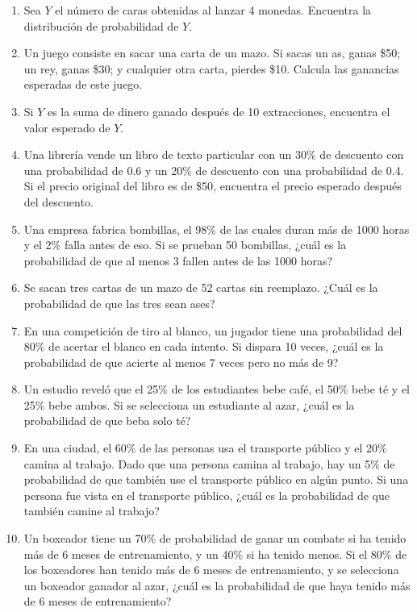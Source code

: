 \documentclass[
  letterpaper,
  DIV=11,
  numbers=noendperiod]{scrartcl}
\begin{document}
\begin{enumerate}
\def\labelenumi{\arabic{enumi}.}
\setcounter{enumi}{16}
\item
  Sea \(Y\) el número de caras obtenidas al lanzar 4 monedas. Encuentra
  la distribución de probabilidad de \(Y\).
\item
  Un juego consiste en sacar una carta de un mazo. Si sacas un as, ganas
  \$50; un rey, ganas \$30; y cualquier otra carta, pierdes \$10.
  Calcula las ganancias esperadas de este juego.
\item
  Si \(Y\) es la suma de dinero ganado después de 10 extracciones,
  encuentra el valor esperado de \(Y\).
\item
  Una librería vende un libro de texto particular con un 30\% de
  descuento con una probabilidad de 0.6 y un 20\% de descuento con una
  probabilidad de 0.4. Si el precio original del libro es de \$50,
  encuentra el precio esperado después del descuento.
\item
  Una empresa fabrica bombillas, el 98\% de las cuales duran más de 1000
  horas y el 2\% falla antes de eso. Si se prueban 50 bombillas, ¿cuál
  es la probabilidad de que al menos 3 fallen antes de las 1000 horas?
\item
  Se sacan tres cartas de un mazo de 52 cartas sin reemplazo. ¿Cuál es
  la probabilidad de que las tres sean ases?
\item
  En una competición de tiro al blanco, un jugador tiene una
  probabilidad del 80\% de acertar el blanco en cada intento. Si dispara
  10 veces, ¿cuál es la probabilidad de que acierte al menos 7 veces
  pero no más de 9?
\item
  Un estudio reveló que el 25\% de los estudiantes bebe café, el 50\%
  bebe té y el 25\% bebe ambos. Si se selecciona un estudiante al azar,
  ¿cuál es la probabilidad de que beba solo té?
\item
  En una ciudad, el 60\% de las personas usa el transporte público y el
  20\% camina al trabajo. Dado que una persona camina al trabajo, hay un
  5\% de probabilidad de que también use el transporte público en algún
  punto. Si una persona fue vista en el transporte público, ¿cuál es la
  probabilidad de que también camine al trabajo?
\item
  Un boxeador tiene un 70\% de probabilidad de ganar un combate si ha
  tenido más de 6 meses de entrenamiento, y un 40\% si ha tenido menos.
  Si el 80\% de los boxeadores han tenido más de 6 meses de
  entrenamiento, y se selecciona un boxeador ganador al azar, ¿cuál es
  la probabilidad de que haya tenido más de 6 meses de entrenamiento?

\end{enumerate}
\end{document}
